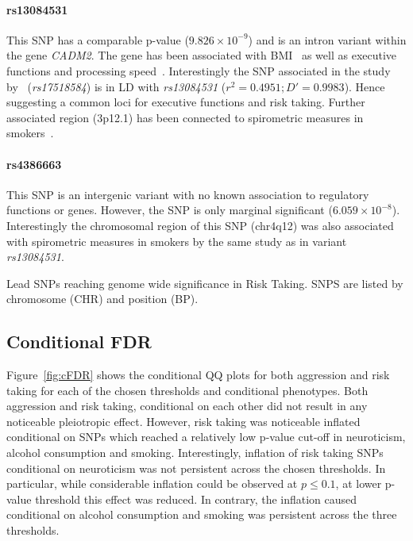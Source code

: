 \paragraph{rs13084531}
\label{par:rs13084531}
This SNP has a comparable p-value ($9.826\times10^{-9}$) and is an intron variant within the gene \textit{CADM2}.
The gene has been associated with BMI~\cite{Speliotes2010} as well as executive functions and processing speed~\cite{Ibrahim-Verbaas2015}.
Interestingly the SNP associated in the study by~\cite{Ibrahim-Verbaas2015} (\textit{rs17518584}) is in LD with \textit{rs13084531} ($r^2=0.4951;D'=0.9983$).
Hence suggesting a common loci for executive functions and risk taking.
Further associated region (3p12.1) has been connected to spirometric measures in smokers~\cite{Lutz2015}.

\paragraph{rs4386663}
\label{par:rs4386663}
This SNP is an intergenic variant with no known association to regulatory functions or genes.
However, the SNP is only marginal significant ($6.059\times10^{-8}$).
Interestingly the chromosomal region of this SNP (chr4q12) was also associated with spirometric measures in smokers by the same study as in variant \textit{rs13084531}.

\begin{table}
	\small
	\centering
	
  \caption{
    Lead SNPs reaching genome wide significance in Risk Taking.
    SNPS are listed by chromosome (CHR) and position (BP).
  }\label{tab:lead_snps_risk}
\end{table}

\subsection{Conditional FDR}
\label{sub:conditional_fdr}

Figure~\ref{fig:cFDR} shows the conditional QQ plots for both aggression and risk taking for each of the chosen thresholds and conditional phenotypes.
Both aggression and risk taking, conditional on each other did not result in any noticeable pleiotropic effect.
However, risk taking was noticeable inflated conditional on SNPs which reached a relatively low p-value cut-off in neuroticism, alcohol consumption and smoking.
Interestingly, inflation of risk taking SNPs conditional on neuroticism was not persistent across the chosen thresholds.
In particular, while considerable inflation could be observed at $p\leq0.1$, at lower p-value threshold this effect was reduced.
In contrary, the inflation caused conditional on alcohol consumption and smoking was persistent across the three thresholds.

